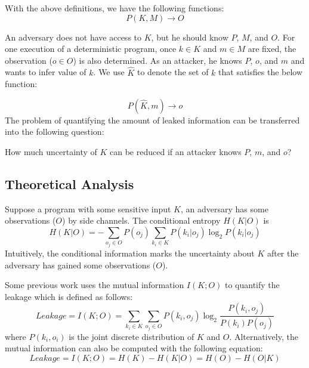 With the above definitions, we have the following functions:
\begin{displaymath}
    P(K, M) \rightarrow	O
\end{displaymath}

An adversary does not have access to $K$, but he should know $P$, $M$, and $O$. 
For one execution of a deterministic program, once $k \in K$ and $m \in M$ are fixed, the 
observation ($o \in O$) is also determined. As an attacker, he knows $P$, $o$, 
and $m$ and wants to infer value of $k$. We use $\hat{K}$ to denote the set of
$k$ that satisfies the below function:

\begin{displaymath}
    P(\hat{K}, m) \rightarrow	o
\end{displaymath}
The problem of quantifying the amount of leaked information can be transferred into the
following question: 

How much uncertainty of $K$ can be reduced if an attacker knows $P$, $m$, and $o$?  

\subsection{Theoretical Analysis}
Suppose a program with some
sensitive input $K$, an adversary has some observations ($O$) by side channels.  
  The conditional entropy $H(K|O)$ is
\begin{displaymath}
    H(K|O) = - \sum_{o_j {\in} O} {P(o_j) \sum_{k_i {\in} K}{P(k_i|o_j)\log_2P(k_i|o_j)}}
\end{displaymath}
Intuitively, the conditional information marks the uncertainty about $K$ after the adversary
has gained some observations ($O$). 

Some previous work uses the mutual information $I(K; O)$ to quantify the leakage which is defined 
as follows:
\begin{displaymath}
    \mathit{Leakage} = I(K;O) = \sum_{k_i {\in} K}{\sum_{o_j {\in} O}{P(k_i, o_j)\log_2\frac{P(k_i, o_j)}{P(k_i)P(o_j)}}}
\end{displaymath}
where $P(k_i, o_i)$ is the joint discrete distribution of $K$ and $O$.
Alternatively, the mutual information can also be computed with the following equation:
\begin{displaymath}
    \mathit{Leakage} = I(K;O) = H(K) - H(K|O) = H(O) - H(O|K)
\end{displaymath}

